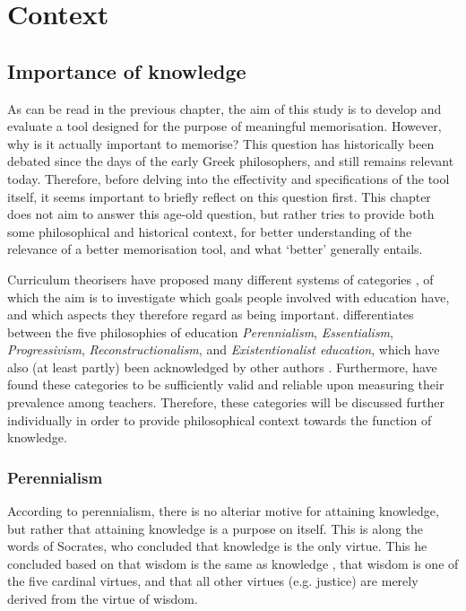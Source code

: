 \chapter{Context}

\section{Importance of knowledge}

As can be read in the previous chapter, the aim of this study is to develop and evaluate a tool designed for the purpose of meaningful memorisation. However, why is it actually important to memorise? This question has historically been debated since the days of the early Greek philosophers, and still remains relevant today. Therefore, before delving into the effectivity and specifications of the tool itself, it seems important to briefly reflect on this question first. This chapter does not aim to answer this age-old question, but rather tries to provide both some philosophical and historical context, for better understanding of the relevance of a better memorisation tool, and what `better' generally entails.

Curriculum theorisers have proposed many different systems of categories \cite{curriculumtheory}, of which the aim is to investigate which goals people involved with education have, and which aspects they therefore regard as being important.  differentiates between the five philosophies of education \emph{Perennialism}, \emph{Essentialism}, \emph{Progressivism}, \emph{Reconstructionalism}, and \emph{Existentionalist education}, which have also (at least partly) been acknowledged by other authors \cite{educationalphilosophy, educationalphilosophy2, educationalphilosophy3, educationalphilosophy4}. Furthermore,  have found these categories to be sufficiently valid and reliable upon measuring their prevalence among teachers. Therefore, these categories will be discussed further individually in order to provide philosophical context towards the function of knowledge.

\subsection{Perennialism}

According to perennialism, there is no alteriar motive for attaining knowledge, but rather that attaining knowledge is a purpose on itself. This is along the words of Socrates, who concluded that knowledge is the only virtue. This he concluded based on that wisdom is the same as knowledge \cite{wisdomknowledge}, that wisdom is one of the five cardinal virtues, and that all other virtues (e.g. justice) are merely derived from the virtue of wisdom.

